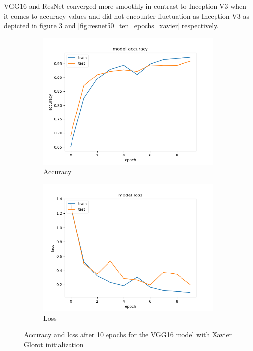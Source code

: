 \documentclass{article}
\theoremstyle{definition}
\theoremstyle{remark}
\begin{document}
VGG16 and ResNet converged more smoothly in contrast to Inception V3 when it comes to accuracy values and did not encounter fluctuation as Inception V3 as depicted in figure \ref{fig:vgg16_ten_epochs_xavier} and \ref{fig:resnet50_ten_epochs_xavier} respectively.


\begin{figure}[h!]
\centering
\begin{subfigure}{.5\textwidth}
  \centering
  \includegraphics[width=1.2\linewidth]{img/from_scratch_models/vgg16_acc.png}
  \caption{Accuracy}
  \label{fig:sub1}
\end{subfigure}%
\begin{subfigure}{.5\textwidth}
  \centering
  \includegraphics[width=1.2\linewidth]{img/from_scratch_models/vgg16_loss.png}
  \caption{Loss}
  \label{fig:sub2}
\end{subfigure}
\caption{Accuracy and loss after 10 epochs for the VGG16 model with Xavier Glorot initialization}
\label{fig:vgg16_ten_epochs_xavier}
\end{figure}
\end{document}
